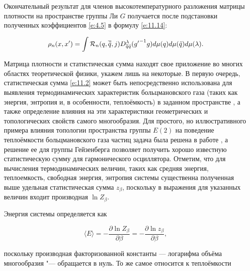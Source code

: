 Окончательный результат для членов высокотемпературного разложения матрицы плотности на пространстве группы Ли $G$ получается после подстановки полученных коэффициентов \eqref{e:4.5} в формулу \eqref{e:11.14}:

\begin{equation}\label{e:4.14}

\rho_{n}(x,x')=\int {\cal R}_{n}(q,\overline{\tilde q},j) D^{\lambda}_{\overline{q} \tilde

q}({g'}^{-1}g)d\mu(q) d\mu(\tilde q) d\mu(\lambda).

\end{equation}



\pagebreak




Матрица плотности и статистическая сумма находят  свое приложение во многих областях теоретической физики, укажем лишь на некоторые. В первую очередь, статистическая сумма \eqref{e:11.2} может быть непосредственно использована для выявления термодинамических характеристик больцмановского газа (таких как энергия, энтропия и, в особенности, теплоёмкость) в заданном пространстве \cite{mikh:bib:LL5}, а также определение влияния на эти характеристики геометрических и топологических свойств самого многообразия. Для простого, но иллюстративного примера влияния топологии пространства группы $E(2)$ на поведение теплоёмкости больцмановского газа частиц задача была решена в работе \cite{mikh:bib:MS3}, а решение ее для группы Гейзенберга позволяет получить хорошо известную статистическую сумму для гармонического осциллятора. Отметим, что для вычисления термодинамических величин, таких как средняя энергия, теплоемкость, свободная энергия, энтропия системы существенна полученная выше удельная статистическая сумма $z_{\beta}$, поскольку в выражения для указанных величин входит производная $\ln Z_{\beta}$.



Энергия системы определяется как

\begin{equation}

\langle E \rangle =-\frac{\partial \ln Z_{\beta}}{\partial \beta}=-\frac{\partial \ln z_{\beta}}{\partial \beta},

\end{equation}

поскольку производная факторизованной константы --- логарифма объёма многообразия "--- обращается в нуль. То же самое относится к теплоёмкости

